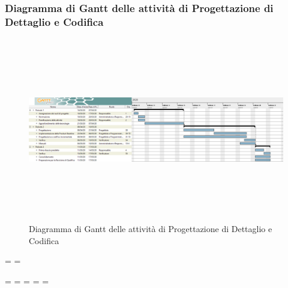 \subsubsection{Diagramma di Gantt delle attività di Progettazione di Dettaglio e Codifica}
\pagestyle{empty}
\begin{figure}[h]
	\centering
	\includegraphics[height = 8cm, width = 24.5cm]{Sezioni/DiagrammiGantt/ProgettazioneDiDettaglio.png}
	\caption{Diagramma di Gantt delle attività di Progettazione di Dettaglio e Codifica}
\end{figure}

\textwidth=\hsize
\textheight=\vsize

\endgroup
\newpage
\paperwidth=\pdfpageheight
\paperheight=\pdfpagewidth
\pdfpageheight=\paperheight
\pdfpagewidth=\paperwidth
\headwidth=\textwidth